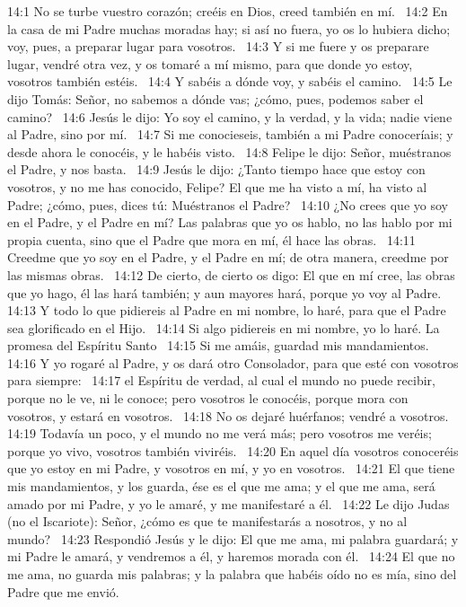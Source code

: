 14:1 No se turbe vuestro corazón; creéis en Dios, creed también en mí.  
14:2 En la casa de mi Padre muchas moradas hay; si así no fuera, yo os lo hubiera dicho; voy, pues, a preparar lugar para vosotros.  
14:3 Y si me fuere y os preparare lugar, vendré otra vez, y os tomaré a mí mismo, para que donde yo estoy, vosotros también estéis.  
14:4 Y sabéis a dónde voy, y sabéis el camino.  
14:5 Le dijo Tomás: Señor, no sabemos a dónde vas; ¿cómo, pues, podemos saber el camino?  
14:6 Jesús le dijo: Yo soy el camino, y la verdad, y la vida; nadie viene al Padre, sino por mí.  
14:7 Si me conocieseis, también a mi Padre conoceríais; y desde ahora le conocéis, y le habéis visto.  
14:8 Felipe le dijo: Señor, muéstranos el Padre, y nos basta.  
14:9 Jesús le dijo: ¿Tanto tiempo hace que estoy con vosotros, y no me has conocido, Felipe? El que me ha visto a mí, ha visto al Padre; ¿cómo, pues, dices tú: Muéstranos el Padre?  
14:10 ¿No crees que yo soy en el Padre, y el Padre en mí? Las palabras que yo os hablo, no las hablo por mi propia cuenta, sino que el Padre que mora en mí, él hace las obras.  
14:11 Creedme que yo soy en el Padre, y el Padre en mí; de otra manera, creedme por las mismas obras.  
14:12 De cierto, de cierto os digo: El que en mí cree, las obras que yo hago, él las hará también; y aun mayores hará, porque yo voy al Padre.  
14:13 Y todo lo que pidiereis al Padre en mi nombre, lo haré, para que el Padre sea glorificado en el Hijo.  
14:14 Si algo pidiereis en mi nombre, yo lo haré. 
La promesa del Espíritu Santo  
14:15 Si me amáis, guardad mis mandamientos.  
14:16 Y yo rogaré al Padre, y os dará otro Consolador, para que esté con vosotros para siempre:  
14:17 el Espíritu de verdad, al cual el mundo no puede recibir, porque no le ve, ni le conoce; pero vosotros le conocéis, porque mora con vosotros, y estará en vosotros.  
14:18 No os dejaré huérfanos; vendré a vosotros.  
14:19 Todavía un poco, y el mundo no me verá más; pero vosotros me veréis; porque yo vivo, vosotros también viviréis.  
14:20 En aquel día vosotros conoceréis que yo estoy en mi Padre, y vosotros en mí, y yo en vosotros.  
14:21 El que tiene mis mandamientos, y los guarda, ése es el que me ama; y el que me ama, será amado por mi Padre, y yo le amaré, y me manifestaré a él.  
14:22 Le dijo Judas (no el Iscariote): Señor, ¿cómo es que te manifestarás a nosotros, y no al mundo?  
14:23 Respondió Jesús y le dijo: El que me ama, mi palabra guardará; y mi Padre le amará, y vendremos a él, y haremos morada con él.  
14:24 El que no me ama, no guarda mis palabras; y la palabra que habéis oído no es mía, sino del Padre que me envió.  
